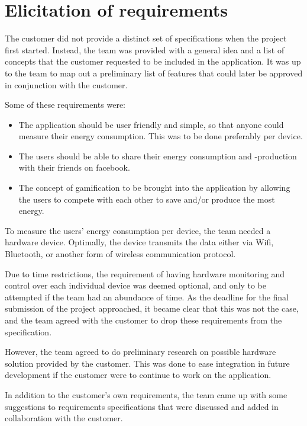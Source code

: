 \section{Elicitation of requirements}
\label{sec:obtainingreq}

The customer did not provide a distinct set of specifications when the project first started. Instead, the team was provided with a general idea and a list of concepts that the customer requested to be included in the application. It was up to the team to map out a preliminary list of features that could later be approved in conjunction with the customer. 

Some of these requirements were:
\begin{itemize}
\item The application should be user friendly and simple, so that anyone could measure their energy consumption. This was to be done preferably per device. 
\item The users should be able to share their energy consumption and -production with their friends on \gls{facebook}. 
\item The concept of \gls{gamification} to be brought into the application by allowing the users to compete with each other to save and/or produce the most energy. 
\end{itemize}

\noindent To measure the users' energy consumption per device, the team needed a hardware device. Optimally, the device transmits the data either via Wifi, Bluetooth, or another form of wireless communication protocol.

Due to time restrictions, the requirement of having hardware monitoring and control over each individual device was deemed optional, and only to be attempted if the team had an abundance of time. As the deadline for the final submission of the project approached, it became clear that this was not the case, and the team agreed with the customer to drop these requirements from the specification. 

However, the team agreed to do preliminary research on possible hardware solution provided by the customer. This was done to ease integration in future development if the customer were to continue to work on the application.

In addition to the customer's own requirements, the team came up with some suggestions to requirements specifications that were discussed and added in collaboration with the customer. %